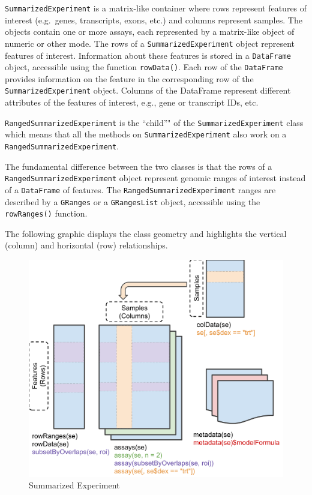 \documentclass[]{article}
\begin{document}
\texttt{SummarizedExperiment} is a matrix-like container where rows
represent features of interest (e.g.~genes, transcripts, exons, etc.)
and columns represent samples. The objects contain one or more assays,
each represented by a matrix-like object of numeric or other mode. The
rows of a \texttt{SummarizedExperiment} object represent features of
interest. Information about these features is stored in a
\texttt{DataFrame} object, accessible using the function
\texttt{rowData()}. Each row of the \texttt{DataFrame} provides
information on the feature in the corresponding row of the
\texttt{SummarizedExperiment} object. Columns of the DataFrame represent
different attributes of the features of interest, e.g., gene or
transcript IDs, etc.

\texttt{RangedSummarizedExperiment} is the ``child''" of the
\texttt{SummarizedExperiment} class which means that all the methods on
\texttt{SummarizedExperiment} also work on a
\texttt{RangedSummarizedExperiment}.

The fundamental difference between the two classes is that the rows of a
\texttt{RangedSummarizedExperiment} object represent genomic ranges of
interest instead of a \texttt{DataFrame} of features. The
\texttt{RangedSummarizedExperiment} ranges are described by a
\texttt{GRanges} or a \texttt{GRangesList} object, accessible using the
\texttt{rowRanges()} function.

The following graphic displays the class geometry and highlights the
vertical (column) and horizontal (row) relationships.

\begin{figure}
\centering
\includegraphics{SE.svg}
\caption{Summarized Experiment}
\end{figure}
\end{document}
